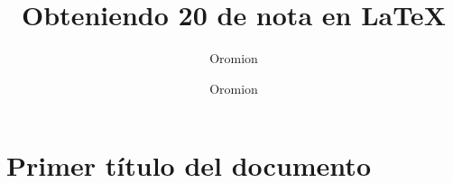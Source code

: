 \documentclass{oromion}
\title{Obteniendo 20 de nota en \LaTeX}
\subtitle[Aproximación desde la teoría de estabilidad de ecuaciones diferenciales ordinarias]
\author{Oromion}
\author{Oromion}
\begin{document}
\maketitle
\section{Primer título del documento}
\lipsum[1]
\end{document}
